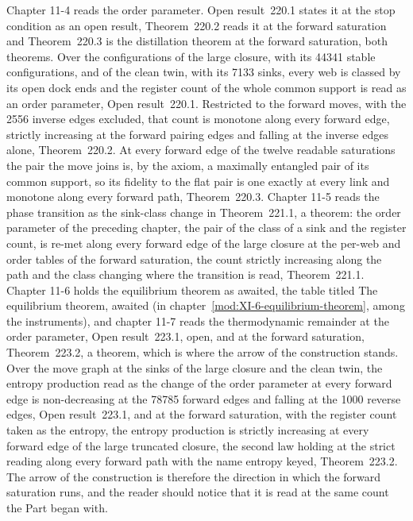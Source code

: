 Chapter 11-4 reads the order parameter. Open result~220.1 states it at the stop condition as an open result, Theorem~220.2 reads it at the forward saturation and Theorem~220.3 is the distillation theorem at the forward saturation, both theorems. Over the configurations of the large closure, with its 44341 stable configurations, and of the clean twin, with its 7133 sinks, every web is classed by its open dock ends and the register count of the whole common support is read as an order parameter, Open result~220.1. Restricted to the forward moves, with the 2556 inverse edges excluded, that count is monotone along every forward edge, strictly increasing at the forward pairing edges and falling at the inverse edges alone, Theorem~220.2. At every forward edge of the twelve readable saturations the pair the move joins is, by the axiom, a maximally entangled pair of its common support, so its fidelity to the flat pair is one exactly at every link and monotone along every forward path, Theorem~220.3. Chapter 11-5 reads the phase transition as the sink-class change in Theorem~221.1, a theorem: the order parameter of the preceding chapter, the pair of the class of a sink and the register count, is re-met along every forward edge of the large closure at the per-web and order tables of the forward saturation, the count strictly increasing along the path and the class changing where the transition is read, Theorem~221.1. Chapter 11-6 holds the equilibrium theorem as awaited, the table titled The equilibrium theorem, awaited (in chapter~\ref{mod:XI-6-equilibrium-theorem}, among the instruments), and chapter 11-7 reads the thermodynamic remainder at the order parameter, Open result~223.1, open, and at the forward saturation, Theorem~223.2, a theorem, which is where the arrow of the construction stands. Over the move graph at the sinks of the large closure and the clean twin, the entropy production read as the change of the order parameter at every forward edge is non-decreasing at the 78785 forward edges and falling at the 1000 reverse edges, Open result~223.1, and at the forward saturation, with the register count taken as the entropy, the entropy production is strictly increasing at every forward edge of the large truncated closure, the second law holding at the strict reading along every forward path with the name entropy keyed, Theorem~223.2. The arrow of the construction is therefore the direction in which the forward saturation runs, and the reader should notice that it is read at the same count the Part began with.

